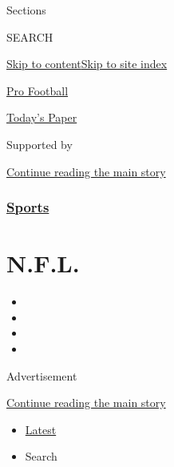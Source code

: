 Sections

SEARCH

\protect\hyperlink{site-content}{Skip to
content}\protect\hyperlink{site-index}{Skip to site index}

\href{https://www.nytimes.com/section/sports/football}{Pro Football}

\href{https://myaccount.nytimes.com/auth/login?response_type=cookie\&client_id=vi}{}

\href{https://www.nytimes.com/section/todayspaper}{Today's Paper}

Supported by

\protect\hyperlink{after-sponsor}{Continue reading the main story}

\hypertarget{sports}{%
\subsubsection{\texorpdfstring{\href{/section/sports}{Sports}}{Sports}}\label{sports}}

\hypertarget{nfl}{%
\section{N.F.L.}\label{nfl}}

\begin{itemize}
\item
\item
\item
\item
\end{itemize}

Advertisement

\protect\hyperlink{after-subheader}{Continue reading the main story}

\begin{itemize}
\tightlist
\item
  \protect\hyperlink{stream-panel}{Latest}
\item
  Search
\end{itemize}

